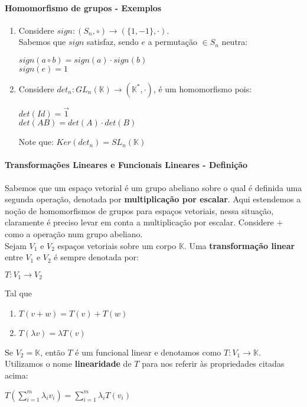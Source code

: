 \documentclass[12pt]{article}
\begin{document}
\paragraph{Homomorfismo de grupos - Exemplos}
	\begin{enumerate}
		\item Considere $sign: (S_n, \circ) \rightarrow (\lbrace 1,-1 \rbrace, \cdot)$.\\
		Sabemos que $sign$ satisfaz, sendo $e$ a permutação $\in S_n$ neutra: \begin{center} $sign(a \circ b) = sign(a) \cdot sign(b)$ \\[5pt] $sign(e) = 1$ \end{center}
		\item Considere $det_n: GL_n(\mathbb{K}) \rightarrow (\mathbb{K}^*,\cdot)$, é um homomorfismo pois:
			\begin{center}
				$det(Id) = \overrightarrow{1}$ \\
				$det(AB) = det(A) \cdot det(B)$
			\end{center}
		Note que: $Ker(det_n) = SL_n(\mathbb{K})$
	\end{enumerate}
	
\paragraph{Transformações Lineares e Funcionais Lineares - Definição\\}
		Sabemos que um espaço vetorial é um grupo abeliano sobre o qual é definida uma segunda operação, denotada por \textbf{multiplicação por escalar}. Aqui estendemos a noção de homomorfismos de grupos para espaços vetoriais, nessa situação, claramente é preciso levar em conta a multiplicação por escalar. Considere $+$ como a operação num grupo abeliano.\\
		Sejam $V_1$ e $V_2$ espaços vetoriais sobre um corpo $\mathbb{K}$. Uma \textbf{transformação linear} entre $V_1$ e $V_2$ é sempre denotada por:
		\begin{center}
			$T: V_1 \rightarrow V_2$
		\end{center}
	Tal que \begin{enumerate}
	\item $ T(v + w) = T(v) + T(w)$
	\item $T(\lambda v) = \lambda T(v)$
	\end{enumerate}
	Se $V_2 = \mathbb{K}$, então $T$ é um funcional linear e denotamos como $T: V_1 \rightarrow \mathbb{K}$.\\
	Utilizamos o nome \textbf{linearidade} de $T$ para nos referir às propriedades citadas acima:
	\begin{center}
		$T \left( \sum\limits_{i=1}^m \lambda_i v_i \right) =  \sum\limits_{i=1}^m \lambda_i T(v_i) $
	\end{center}
\end{document}
